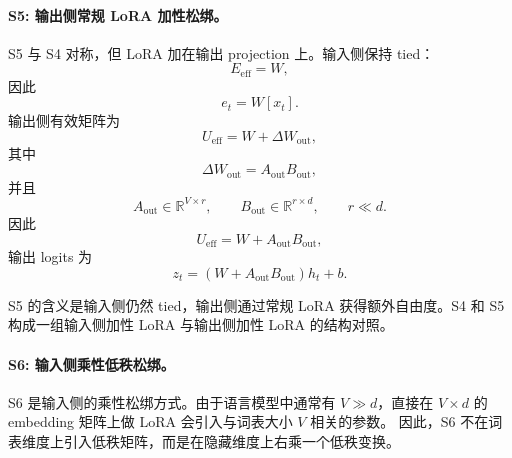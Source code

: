 \paragraph{S5: 输出侧常规 LoRA 加性松绑。}
S5 与 S4 对称，但 LoRA 加在输出 projection 上。输入侧保持 tied：
\begin{equation}
    E_{\mathrm{eff}} = W,
\end{equation}
因此
\begin{equation}
    e_t = W[x_t].
\end{equation}
输出侧有效矩阵为
\begin{equation}
    U_{\mathrm{eff}} = W + \Delta W_{\mathrm{out}},
\end{equation}
其中
\begin{equation}
    \Delta W_{\mathrm{out}} = A_{\mathrm{out}}B_{\mathrm{out}},
\end{equation}
并且
\begin{equation}
    A_{\mathrm{out}} \in \mathbb{R}^{V \times r}, \qquad
    B_{\mathrm{out}} \in \mathbb{R}^{r \times d}, \qquad
    r \ll d.
\end{equation}
因此
\begin{equation}
    U_{\mathrm{eff}} = W + A_{\mathrm{out}}B_{\mathrm{out}},
\end{equation}
输出 logits 为
\begin{equation}
    z_t =
    \left(W + A_{\mathrm{out}}B_{\mathrm{out}}\right)h_t + b.
\end{equation}

S5 的含义是输入侧仍然 tied，输出侧通过常规 LoRA 获得额外自由度。S4 和 S5
构成一组输入侧加性 LoRA 与输出侧加性 LoRA 的结构对照。

\paragraph{S6: 输入侧乘性低秩松绑。}
S6 是输入侧的乘性松绑方式。由于语言模型中通常有 $V \gg d$，直接在
$V \times d$ 的 embedding 矩阵上做 LoRA 会引入与词表大小 $V$ 相关的参数。
因此，S6 不在词表维度上引入低秩矩阵，而是在隐藏维度上右乘一个低秩变换。

